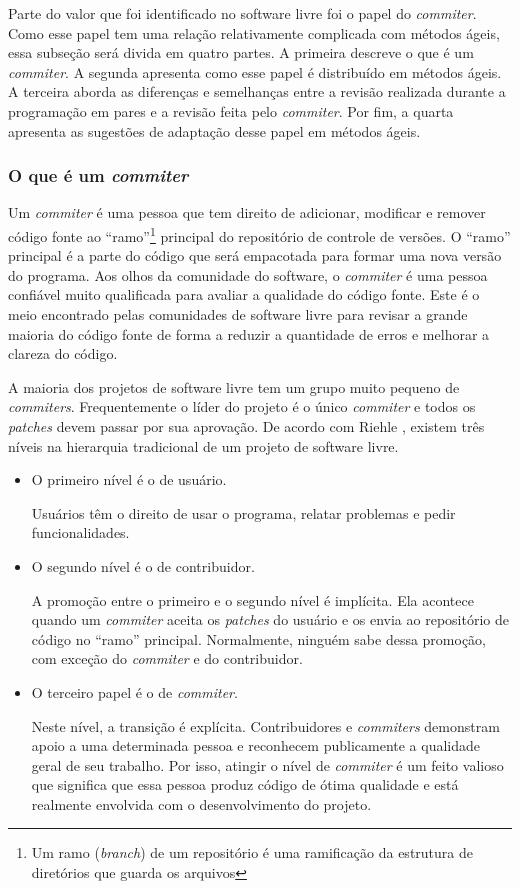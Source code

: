 Parte do valor que foi identificado no software livre foi o papel do
\emph{commiter}. Como esse papel tem uma relação relativamente
complicada com métodos ágeis, essa subseção será divida em quatro
partes. A primeira descreve o que é um \emph{commiter}. A segunda
apresenta como esse papel é distribuído em métodos ágeis. A terceira
aborda as diferenças e semelhanças entre a revisão realizada durante a
programação em pares e a revisão feita pelo \emph{commiter}. Por fim,
a quarta apresenta as sugestões de adaptação desse papel em métodos
ágeis.

\subsubsection{O que é um \emph{commiter}}

Um \emph{commiter} é uma pessoa que tem direito de adicionar,
modificar e remover código fonte ao ``ramo''\footnote{Um ramo
  (\emph{branch}) de um repositório é uma ramificação da estrutura de
  diretórios que guarda os arquivos} principal do repositório de
controle de versões. O ``ramo'' principal é a parte do código que será
empacotada para formar uma nova versão do programa. Aos olhos da
comunidade do software, o \emph{commiter} é uma pessoa confiável muito
qualificada para avaliar a qualidade do código fonte. Este é o meio
encontrado pelas comunidades de software livre para revisar a grande
maioria do código fonte de forma a reduzir a quantidade de erros e
melhorar a clareza do código.

A maioria dos projetos de software livre tem um grupo muito pequeno de
\emph{commiters}. Frequentemente o líder do projeto é o único
\emph{commiter} e todos os \emph{patches} devem passar por sua
aprovação. De acordo com Riehle \cite{Riehle2007}, existem três níveis
na hierarquia tradicional de um projeto de software livre.
\begin{itemize}
\item O primeiro nível é o de usuário.

  Usuários têm o direito de usar o programa, relatar problemas e pedir
  funcionalidades.
\item O segundo nível é o de contribuidor.

  A promoção entre o primeiro e o segundo nível é implícita. Ela
  acontece quando um \emph{commiter} aceita os \emph{patches} do
  usuário e os envia ao repositório de código no ``ramo''
  principal. Normalmente, ninguém sabe dessa promoção, com exceção do
  \emph{commiter} e do contribuidor.
\item O terceiro papel é o de \emph{commiter}.

  Neste nível, a transição é explícita. Contribuidores e
  \emph{commiters} demonstram apoio a uma determinada pessoa e
  reconhecem publicamente a qualidade geral de seu trabalho. Por isso,
  atingir o nível de \emph{commiter} é um feito valioso que significa
  que essa pessoa produz código de ótima qualidade e está realmente
  envolvida com o desenvolvimento do projeto.
\end{itemize}


